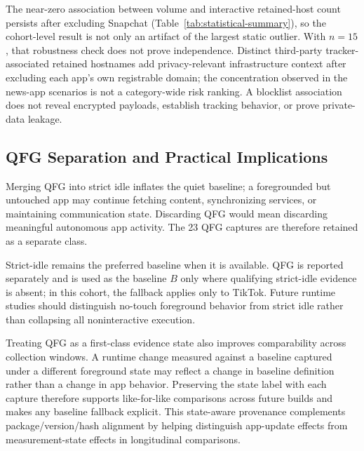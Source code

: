 The near-zero association between volume and interactive retained-host count persists after excluding Snapchat (Table~\ref{tab:statistical-summary}), so the cohort-level result is not only an artifact of the largest static outlier. With $n=15$, that robustness check does not prove independence. Distinct third-party tracker-associated retained hostnames add privacy-relevant infrastructure context after excluding each app's own registrable domain; the concentration observed in the news-app scenarios is not a category-wide risk ranking. A blocklist association does not reveal encrypted payloads, establish tracking behavior, or prove private-data leakage.

\subsection{QFG Separation and Practical Implications}

Merging QFG into strict idle inflates the quiet baseline; a foregrounded but untouched app may continue fetching content, synchronizing services, or maintaining communication state. Discarding QFG would mean discarding meaningful autonomous app activity. The 23 QFG captures are therefore retained as a separate class.

Strict-idle remains the preferred baseline when it is available. QFG is reported separately and is used as the baseline $B$ only where qualifying strict-idle evidence is absent; in this cohort, the fallback applies only to TikTok. Future runtime studies should distinguish no-touch foreground behavior from strict idle rather than collapsing all noninteractive execution.

Treating QFG as a first-class evidence state also improves comparability across collection windows. A runtime change measured against a baseline captured under a different foreground state may reflect a change in baseline definition rather than a change in app behavior. Preserving the state label with each capture therefore supports like-for-like comparisons across future builds and makes any baseline fallback explicit. This state-aware provenance complements package/version/hash alignment by helping distinguish app-update effects from measurement-state effects in longitudinal comparisons.
